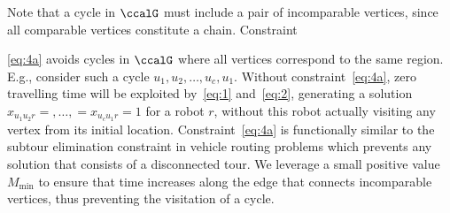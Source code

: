 \documentclass[journal]{IEEEtran}
\begin{document}
  {Note that a cycle in $\ccalG$ must include a pair of incomparable vertices, since all comparable vertices constitute a chain.} Constraint~{\eqref{eq:4a} avoids cycles in $\ccalG$ where all vertices correspond to the same region. E.g., consider such a cycle $u_1,u_2,\ldots, u_c, u_1$. Without  constraint~\eqref{eq:4a}, zero travelling time will be exploited by~\eqref{eq:1} and~\eqref{eq:2}, generating a solution $x_{u_1 u_2 r} = ,\ldots,=x_{u_c u_{1} r}= 1$ for a robot $r$, without this robot actually visiting any vertex from its initial location.  Constraint~\eqref{eq:4a} is functionally similar to the subtour elimination constraint in vehicle routing problems which prevents any solution that consists of a disconnected tour. We leverage a small positive value $M_{\min}$ to ensure that time increases along the edge that connects incomparable vertices, thus preventing the visitation of a cycle.

}
\end{document}
